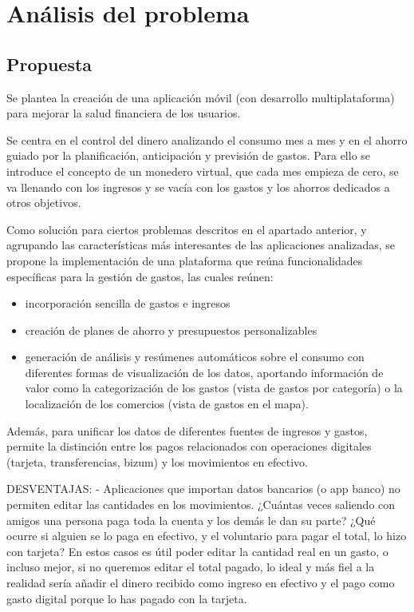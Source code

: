 \chapter{Análisis del problema}
 
\section{Propuesta}
Se plantea la creación de una aplicación móvil (con desarrollo multiplataforma) 
para mejorar la salud financiera de los usuarios. 

Se centra en el control del dinero analizando el consumo mes a mes y en el 
ahorro guiado por la planificación, anticipación y previsión de gastos. Para ello 
se introduce el concepto de un monedero virtual, que cada mes empieza de cero, se va 
llenando con los ingresos y se vacía con los gastos y los ahorros dedicados a otros objetivos.

Como solución para ciertos problemas descritos en el apartado anterior, y agrupando 
las características más interesantes de las aplicaciones analizadas, se propone la 
implementación de una plataforma que reúna funcionalidades específicas para la 
gestión de gastos, las cuales reúnen:
\begin{itemize}
\item incorporación sencilla de gastos e ingresos
\item creación de planes de ahorro y presupuestos personalizables
\item generación de análisis y resúmenes automáticos sobre el consumo 
con diferentes formas de visualización de los datos, aportando información 
de valor como la categorización de los gastos (vista de gastos por categoría) o 
la localización de los comercios (vista de gastos en el mapa).
\end{itemize}

Además, para unificar los datos de diferentes fuentes de ingresos y gastos, permite la 
distinción entre los pagos relacionados con operaciones digitales (tarjeta, transferencias, bizum) y los movimientos en efectivo.

DESVENTAJAS:
- Aplicaciones que importan datos bancarios (o app banco) no permiten editar las cantidades 
en los movimientos. ¿Cuántas veces saliendo con amigos una persona paga toda la cuenta 
y los demás le dan su parte? ¿Qué ocurre si alguien se lo paga en efectivo, y el voluntario para pagar el total, lo hizo con tarjeta? En estos casos es útil poder editar la cantidad real en un gasto, o incluso mejor, si no queremos editar el total pagado, lo ideal y más fiel a la realidad sería añadir el dinero recibido como ingreso en efectivo y el pago como gasto digital porque lo has pagado con la tarjeta. 

